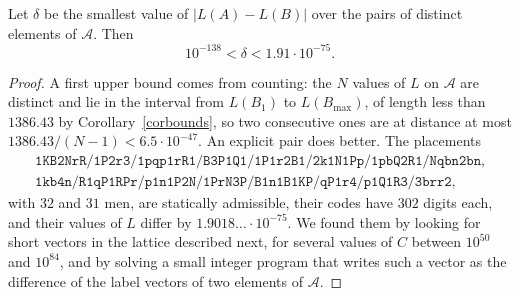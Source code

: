 \documentclass[12pt,reqno]{article}
\newcommand{\adm}{\mathcal{A}}
\begin{document}
\begin{proposition}\label{propgap}
Let $\delta$ be the smallest value of $|L(A)-L(B)|$ over the pairs of distinct elements of
$\adm$. Then
\begin{displaymath}
10^{-138}<\delta<1.91\cdot 10^{-75}.
\end{displaymath}
\end{proposition}

\begin{proof}
A first upper bound comes from counting: the $N$ values of $L$ on $\adm$ are distinct and lie in
the interval from $L(B_1)$ to $L(B_{\max})$, of length less than $1386.43$ by
Corollary~\ref{corbounds}, so two consecutive ones are at distance at most
$1386.43/(N-1)<6.5\cdot 10^{-47}$. An explicit pair does better. The placements
\begin{displaymath}
\begin{array}{l}
\texttt{1KB2NrR/1P2r3/1pqp1rR1/B3P1Q1/1P1r2B1/2k1N1Pp/1pbQ2R1/Nqbn2bn},\\
\texttt{1kb4n/R1qP1RPr/p1n1P2N/1PrN3P/B1n1B1KP/qP1r4/p1Q1R3/3brr2},
\end{array}
\end{displaymath}
with $32$ and $31$ men, are statically admissible, their codes have $302$ digits each, and their
values of $L$ differ by $1.9018\ldots\cdot 10^{-75}$. We found them by looking for short vectors in the
lattice described next, for several values of $C$ between $10^{50}$ and $10^{84}$, and by solving a small integer program that writes
such a vector as the difference of the label vectors of two elements of $\adm$.


\end{proof}
\end{document}
